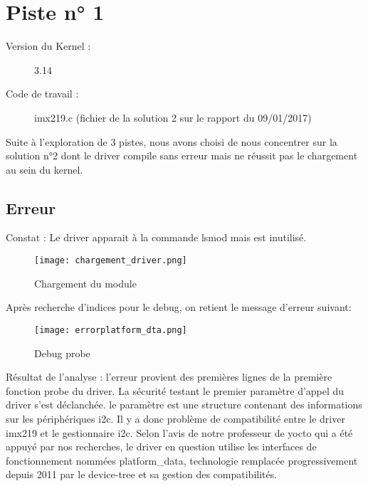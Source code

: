 \chapter{Piste n° 1} %
\label{Chapter2} %

\begin{description}
  \item[Version du Kernel :] 3.14
  \item[Code de travail :] imx219.c (fichier de la solution 2 sur le rapport du
  09/01/2017)
\end{description}

Suite à l'exploration de 3 pistes, nous avons choisi de nous
concentrer sur la solution n°2 dont le driver compile sans erreur mais ne
réussit pas le chargement au sein du kernel.

\section{Erreur}
Constat : Le driver apparait à la commande lsmod mais est inutilisé.

 \begin{figure}[th]
   \centering
   \texttt{[image: chargement\_driver.png]}
   \decoRule
   \caption{Chargement du module}  \label{fig:planning}
\end{figure}

Après recherche d'indices pour le debug, on retient le message d'erreur suivant:
\begin{figure}[th]
  \centering
  \texttt{[image: errorplatform\_dta.png]}
  \decoRule
  \caption{Debug probe}  \label{fig:planning}
\end{figure}

Résultat de l'analyse :
l'erreur provient des premières lignes de la première fonction probe du driver. La
sécurité testant le premier paramètre d'appel du driver s'est déclanchée. le
paramètre est une structure contenant des informations sur les périphériques i2c.
Il y a donc problème de compatibilité entre le driver imx219 et le gestionnaire i2c. Selon
l'avis de notre professeur de yocto qui a été appuyé par nos recherches,
le driver en question utilise les interfaces de fonctionnement nommées
platform\_data, technologie remplacée progressivement depuis 2011 par le
device-tree et sa gestion des compatibilités.

